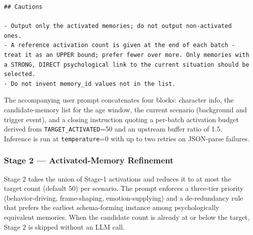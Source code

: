 \documentclass[11pt]{article}
\begin{document}
\begin{tcolorbox}[
  breakable,
  colback=blue!5,
  colframe=blue!60!black,
  title={\textbf{Stage 1 --- Memory Activation Screening Prompt}},
  fonttitle=\bfseries,
  rounded corners,
  boxrule=1.0pt
]
\begin{Verbatim}[fontsize=\scriptsize, breaklines=true, breaksymbolleft={}, breaksymbolright={}, breakindent=1em]
## Cautions

- Output only the activated memories; do not output non-activated ones.
- A reference activation count is given at the end of each batch - treat it as an UPPER bound; prefer fewer over more. Only memories with a STRONG, DIRECT psychological link to the current situation should be selected.
- Do not invent memory_id values not in the list.
\end{Verbatim}
\end{tcolorbox}

The accompanying user prompt concatenates four blocks: character info, the candidate-memory list for the age window, the current scenario (background and trigger event), and a closing instruction quoting a per-batch activation budget derived from \texttt{TARGET\_ACTIVATED}=50 and an upstream buffer ratio of 1.5. Inference is run at \texttt{temperature}=0 with up to two retries on JSON-parse failures.

\subsubsection{Stage 2 --- Activated-Memory Refinement}
\label{app:prompt_finalize}

Stage 2 takes the union of Stage-1 activations and reduces it to at most the target count (default 50) per scenario. The prompt enforces a three-tier priority (behavior-driving, frame-shaping, emotion-supplying) and a de-redundancy rule that prefers the earliest schema-forming instance among psychologically equivalent memories. When the candidate count is already at or below the target, Stage 2 is skipped without an LLM call.
\end{document}
